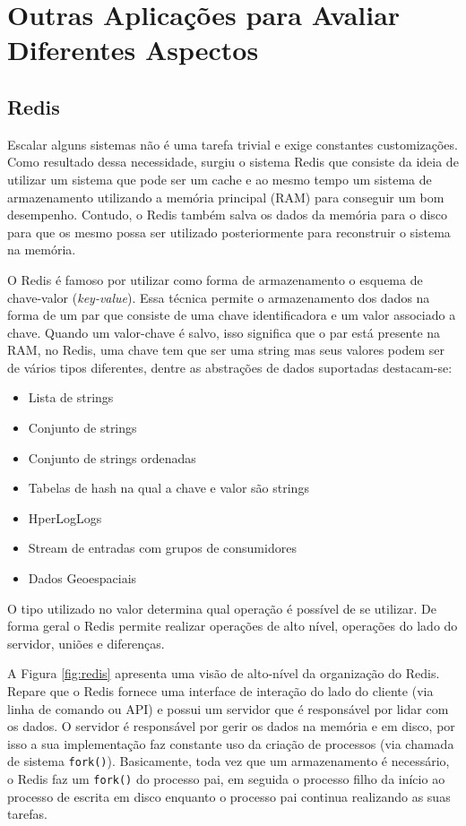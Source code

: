 \section{Outras Aplicações para Avaliar Diferentes Aspectos}


\subsection{Redis}

Escalar alguns sistemas não é uma tarefa trivial e exige constantes
customizações. Como resultado dessa necessidade, surgiu o sistema Redis que
consiste da ideia de utilizar um sistema que pode ser um cache e ao mesmo tempo
um sistema de armazenamento utilizando a memória principal (RAM) para conseguir
um bom desempenho. Contudo, o Redis também salva os dados da memória para o
disco para que os mesmo possa ser utilizado posteriormente para reconstruir o
sistema na memória.

O Redis é famoso por utilizar como forma de armazenamento o esquema de
chave-valor (\textit{key-value}). Essa técnica permite o armazenamento dos dados na
forma de um par que consiste de uma chave identificadora e um valor associado a
chave. Quando um valor-chave é salvo, isso significa que o par está presente na
RAM, no Redis, uma chave tem que ser uma string mas seus valores podem ser de
vários tipos diferentes, dentre as abstrações de dados suportadas destacam-se:

\begin{itemize}
  \item Lista de strings
  \item Conjunto de strings
  \item Conjunto de strings ordenadas
  \item Tabelas de hash na qual a chave e valor são strings
  \item HperLogLogs
  \item Stream de entradas com grupos de consumidores
  \item Dados Geoespaciais
\end{itemize}

O tipo utilizado no valor determina qual operação é possível de se utilizar. De
forma geral o Redis permite realizar operações de alto nível, operações do lado
do servidor, uniões e diferenças.

A Figura \ref{fig:redis} apresenta uma visão de alto-nível da organização do
Redis. Repare que o Redis fornece uma interface de interação do lado do cliente
(via linha de comando ou API) e possui um servidor que é responsável por lidar
com os dados.  O servidor é responsável por gerir os dados na memória e em
disco, por isso a sua implementação faz constante uso da criação de processos
(via chamada de sistema \texttt{fork()}). Basicamente, toda vez que um
armazenamento é necessário, o Redis faz um \texttt{fork()} do processo pai, em
seguida o processo filho da início ao processo de escrita em disco enquanto o
processo pai continua realizando as suas tarefas. 

